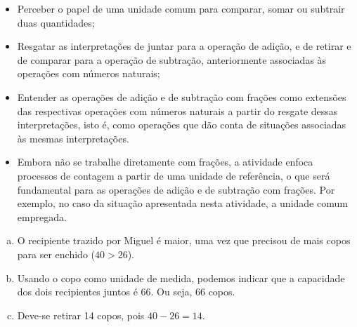 \begin{multicols}{2}
\begin{objetivos}[code={\setcounter{tcb@cnt@objetivos}{0}}, label=chap5-ativ1]{}{}
\begin{itemize} %
  \item     Perceber o papel de uma unidade comum para comparar, somar ou subtrair duas quantidades;
  \item     Resgatar as interpretações de juntar para a operação de adição, e de retirar e de comparar para a operação de subtração, anteriormente associadas às operações com números naturais;
  \item     Entender as operações de adição e de subtração com frações como extensões das respectivas operações com números naturais a partir do resgate dessas interpretações, isto é, como operações que dão conta de situações associadas às mesmas interpretações.
\end{itemize} %
\end{objetivos}

\begin{orientacoes}{}{}
\begin{itemize} %
  \item     Embora não se trabalhe diretamente com frações, a atividade enfoca processos de contagem a partir de uma unidade de referência, o que será fundamental para as operações de adição e de subtração com frações. Por exemplo, no caso da situação apresentada nesta atividade, a unidade comum empregada.
\end{itemize} %
\end{orientacoes}

\begin{solucao}[code={\setcounter{tcb@cnt@solucao}{0}}]{}{}
 \begin{enumerate}[a)]
  \item O recipiente trazido por Miguel é maior, uma vez que precisou de mais copos para ser enchido ($40>26$).
  \item Usando o copo como unidade de medida, podemos indicar que a capacidade dos dois recipientes juntos é 66. Ou seja, 66 copos.
  \item Deve-se retirar 14 copos, pois $40 - 26=14$.
 \end{enumerate}

\end{solucao}


\begin{objetivos}[label=chap5-ativ2]{}{}


\end{objetivos}
\end{multicols}
